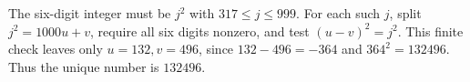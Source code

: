 The six-digit integer must be $j^2$ with $317\le j\le999$. For each such $j$, split $j^2=1000u+v$, require all six digits nonzero, and test $(u-v)^2=j^2$. This finite check leaves only $u=132,v=496$, since $132-496=-364$ and $364^2=132496$. Thus the unique number is $\boxed{132496}$.
